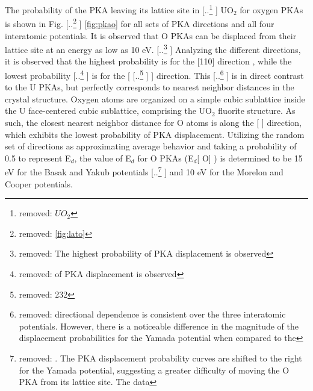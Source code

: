 \documentclass[review]{elsarticle} %
\providecommand{\DIFaddtex}[1]{{\protect\color{blue} \sf #1}} %
\providecommand{\DIFdeltex}[1]{{\protect\color{red} [..\footnote{removed: #1} ]}} %
\providecommand{\DIFaddbegin}{} %
\providecommand{\DIFaddend}{} %
\providecommand{\DIFdelbegin}{} %
\providecommand{\DIFdelend}{} %
\providecommand{\DIFadd}[1]{\texorpdfstring{\DIFaddtex{#1}}{#1}} %
\providecommand{\DIFdel}[1]{\texorpdfstring{\DIFdeltex{#1}}{}} %
\newcommand{\DIFscaledelfig}{0.5}
\newlength{\DIFdelgraphicswidth} %
\newlength{\DIFdelgraphicsheight} %
\newcommand{\DIFaddincludegraphics}[2][]{{\color{blue}\fbox{\DIFOincludegraphics[#1]{#2}}}} %
\newcommand{\DIFdelincludegraphics}[2][]{%
\sbox{\DIFdelgraphicsbox}{\DIFOincludegraphics[#1]{#2}}%
\settoboxwidth{\DIFdelgraphicswidth}{\DIFdelgraphicsbox} %
\settoboxtotalheight{\DIFdelgraphicsheight}{\DIFdelgraphicsbox} %
\scalebox{\DIFscaledelfig}{%
\parbox[b]{\DIFdelgraphicswidth}{\usebox{\DIFdelgraphicsbox}\\[-\baselineskip] \rule{\DIFdelgraphicswidth}{0em}}\llap{\resizebox{\DIFdelgraphicswidth}{\DIFdelgraphicsheight}{%
\setlength{\unitlength}{\DIFdelgraphicswidth}%
\begin{picture}(1,1)%
\thicklines\linethickness{2pt} %
{\color[rgb]{1,0,0}\put(0,0){\framebox(1,1){}}}%
{\color[rgb]{1,0,0}\put(0,0){\line( 1,1){1}}}%
{\color[rgb]{1,0,0}\put(0,1){\line(1,-1){1}}}%
\end{picture}%
}\hspace*{3pt}}} %
} %
\DeclareRobustCommand{\DIFaddbegin}{\DIFOaddbegin \let\includegraphics\DIFaddincludegraphics} %
\DeclareRobustCommand{\DIFaddend}{\DIFOaddend \let\includegraphics\DIFOincludegraphics} %
\DeclareRobustCommand{\DIFdelbegin}{\DIFOdelbegin \let\includegraphics\DIFdelincludegraphics} %
\DeclareRobustCommand{\DIFdelend}{\DIFOaddend \let\includegraphics\DIFOincludegraphics} %
\begin{document}
\DIFaddend The probability of the PKA leaving its lattice site in \DIFdelbegin \DIFdel{$UO_2$ }\DIFdelend \DIFaddbegin \DIFadd{UO$_2$ }\DIFaddend for oxygen PKAs is shown in Fig. \DIFdelbegin \DIFdel{\ref{fig:lato}}\DIFdelend \DIFaddbegin \DIFadd{\ref{fig:pkao} for all sets of PKA directions and all four interatomic potentials}\DIFaddend . It is observed that O PKAs can be displaced from their lattice site at an energy as low as 10 eV. \DIFdelbegin \DIFdel{The highest probability of PKA displacement is observed }\DIFdelend \DIFaddbegin \DIFadd{Analyzing the different directions, it is observed that the highest probability is }\DIFaddend for the [110] direction\DIFaddbegin \DIFadd{, }\DIFaddend while the lowest probability \DIFdelbegin \DIFdel{of PKA displacement is observed }\DIFdelend \DIFaddbegin \DIFadd{is }\DIFaddend for the [\DIFdelbegin \DIFdel{232}\DIFdelend \DIFaddbegin \DIFadd{100}\DIFaddend ] direction. This \DIFdelbegin \DIFdel{directional dependence is consistent over the three interatomic potentials. However, there is a noticeable difference in the magnitude of the displacement probabilities for the Yamada potential when compared to the }\DIFdelend \DIFaddbegin \DIFadd{is in direct contrast to the U PKAs, but perfectly corresponds to nearest neighbor distances in the crystal structure. Oxygen atoms are organized on a simple cubic sublattice inside the U face-centered cubic sublattice, comprising the UO$_2$ fluorite structure. As such, the closest nearest neighbor distance for O atoms is along the }[\DIFadd{100}] \DIFadd{direction, which exhibits the lowest probability of PKA displacement. Utilizing the random set of directions as approximating average behavior and taking a probability of 0.5 to represent E$_d$, the value of E$_d$ for O PKAs (E$_d$}[\DIFadd{O}]\DIFadd{) is determined to be 15 eV for the }\DIFaddend Basak and Yakub potentials \DIFdelbegin \DIFdel{. The PKA displacement probability curves are shifted to the right for the Yamada potential, suggesting a greater difficulty of moving the O PKA from its lattice site. The data }\DIFdelend \DIFaddbegin \DIFadd{and 10 eV for the Morelon and Cooper potentials.
}
\end{document}
